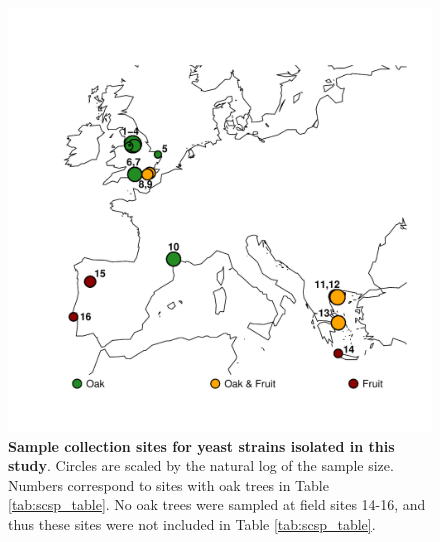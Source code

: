 \documentclass[12pt]{article}
\begin{document}
\begin{figure}[h!] \centering 
\includegraphics[width=1.0\textwidth]{../figs_tables/Figure1Sampling.pdf} 
\caption{{\bf Sample collection sites for yeast strains isolated in this study}. Circles are scaled by the natural log of the sample size. Numbers correspond to sites with oak trees in Table \ref{tab:scsp_table}. No oak trees were sampled at field sites 14-16, and thus these sites were not included in Table \ref{tab:scsp_table}.}
\label{fig:sampling_figure} 
\end{figure}
\clearpage
\end{document}

